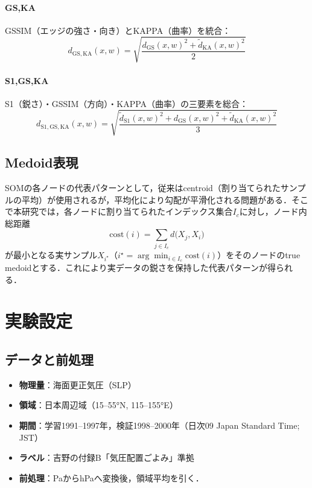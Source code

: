 \documentclass{jarticle}
\theoremstyle{definition}
\begin{document}
\paragraph{GS,KA}
GSSIM（エッジの強さ・向き）とKAPPA（曲率）を統合：
\begin{equation}
d_{\mathrm{GS,KA}}(x,w)=\sqrt{\frac{d_{\mathrm{GS}}(x,w)^2+\tilde d_{\mathrm{KA}}(x,w)^2}{2}}
\end{equation}

\paragraph{S1,GS,KA}
S1（鋭さ）・GSSIM（方向）・KAPPA（曲率）の三要素を総合：
\begin{equation}
d_{\mathrm{S1,GS,KA}}(x,w)=\sqrt{\frac{\tilde d_{\mathrm{S1}}(x,w)^2+d_{\mathrm{GS}}(x,w)^2+\tilde d_{\mathrm{KA}}(x,w)^2}{3}}
\end{equation}

\subsection{Medoid表現}
SOMの各ノードの代表パターンとして，従来はcentroid（割り当てられたサンプルの平均）が使用されるが，平均化により勾配が平滑化される問題がある．そこで本研究では，各ノードに割り当てられたインデックス集合$I_c$に対し，ノード内総距離
\begin{equation}
\mathrm{cost}(i)=\sum_{j\in I_c} d\bigl(X_j, X_i\bigr)
\end{equation}
が最小となる実サンプル$X_{i^\star}$（$i^\star=\arg\min_{i\in I_c}\mathrm{cost}(i)$）をそのノードのtrue medoidとする．これにより実データの鋭さを保持した代表パターンが得られる．

\section{実験設定}
\subsection{データと前処理}
\begin{itemize}
\item \textbf{物理量}：海面更正気圧（SLP）
\item \textbf{領域}：日本周辺域（15–55°N, 115–155°E）
\item \textbf{期間}：学習1991–1997年，検証1998–2000年（日次09 Japan Standard Time; JST）
\item \textbf{ラベル}：吉野\cite{吉野2002日本の気候}の付録B「気圧配置ごよみ」準拠
\item \textbf{前処理}：PaからhPaへ変換後，領域平均を引く．
\end{itemize}
\end{document}
